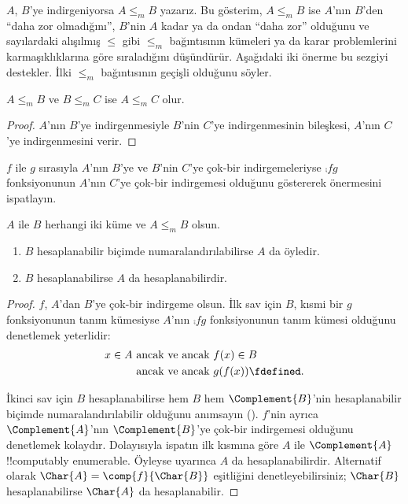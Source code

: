


$A$, $B$'ye indirgeniyorsa $A\leq_m B$ yazarız. Bu gösterim,
$A\leq_m B$ ise $A$'nın $B$'den ``daha zor olmadığını'', $B$'nin $A$ kadar
ya da ondan ``daha zor'' olduğunu ve sayılardaki alışılmış $\leq$ gibi
$\leq_m$ bağıntısının kümeleri ya da karar problemlerini karmaşıklıklarına
göre sıraladığını düşündürür. Aşağıdaki iki önerme bu sezgiyi destekler.
İlki $\leq_m$ bağıntısının geçişli olduğunu söyler.

\begin{prop}
$A\leq_m B$ ve $B\leq_m C$ ise $A\leq_m C$ olur.
\end{prop}

\begin{proof}
$A$'nın $B$'ye indirgenmesiyle $B$'nin $C$'ye indirgenmesinin bileşkesi,
$A$'nın $C$'ye indirgenmesini verir.
\end{proof}

\begin{prob}
$f$ ile $g$ sırasıyla $A$'nın $B$'ye ve $B$'nin $C$'ye çok-bir
indirgemeleriyse $\comp{f}{g}$ fonksiyonunun $A$'nın $C$'ye çok-bir
indirgemesi olduğunu göstererek  önermesini ispatlayın.
\end{prob}

\begin{prop}
$A$ ile $B$ herhangi iki küme ve $A\leq_m B$ olsun.
\begin{enumerate}
\item $B$ hesaplanabilir biçimde numaralandırılabilirse $A$ da öyledir.
\item $B$ hesaplanabilirse $A$ da hesaplanabilirdir.
\end{enumerate}
\end{prop}

\begin{proof}
$f$, $A$'dan $B$'ye çok-bir indirgeme olsun. İlk sav için $B$, kısmi bir
$g$ fonksiyonunun tanım kümesiyse $A$'nın $\comp{f}{g}$ fonksiyonunun tanım
kümesi olduğunu denetlemek yeterlidir:
\begin{align*}
  x\in A & \text{ ancak ve ancak } f(x)\in B\\
  & \text{ ancak ve ancak } g(f(x))\fdefined.
\end{align*}

İkinci sav için $B$ hesaplanabilirse hem $B$ hem $\Complement{B}$'nin
hesaplanabilir biçimde numaralandırılabilir olduğunu anımsayın
(). $f$'nin ayrıca $\Complement{A}$'nın
$\Complement{B}$'ye çok-bir indirgemesi olduğunu denetlemek kolaydır.
Dolayısıyla ispatın ilk kısmına göre $A$ ile $\Complement{A}$
!!{computably enumerable}. Öyleyse  uyarınca $A$ da
hesaplanabilirdir. Alternatif olarak
$\Char{A}=\comp{f}{\Char{B}}$ eşitliğini denetleyebilirsiniz; $\Char{B}$
hesaplanabilirse $\Char{A}$ da hesaplanabilir.
\end{proof}

